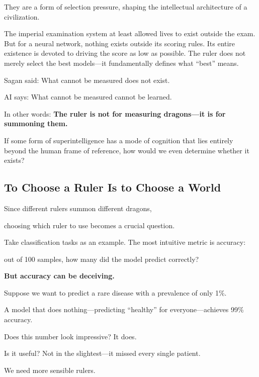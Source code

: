 They are a form of selection pressure, shaping the intellectual architecture of a civilization.

The imperial examination system at least allowed lives to exist outside the exam. But for a neural network, nothing exists outside its scoring rules. Its entire existence is devoted to driving the score as low as possible. The ruler does not merely select the best models---it fundamentally defines what ``best'' means.

\vspace{1em}

Sagan said: What cannot be measured does not exist.

AI says: What cannot be measured cannot be learned.

In other words: \textbf{The ruler is not for measuring dragons---it is for summoning them.}

\begin{thinkbox}
If some form of superintelligence has a mode of cognition that lies entirely beyond the human frame of reference, how would we even determine whether it exists?
\end{thinkbox}

\subsection{To Choose a Ruler Is to Choose a World}

Since different rulers summon different dragons,

choosing which ruler to use becomes a crucial question.

\vspace{1em}

Take classification tasks as an example. The most intuitive metric is accuracy:

out of 100 samples, how many did the model predict correctly?

\textbf{But accuracy can be deceiving.}

Suppose we want to predict a rare disease with a prevalence of only 1\%.

A model that does nothing---predicting ``healthy'' for everyone---achieves 99\% accuracy.

Does this number look impressive? It does.

Is it useful? Not in the slightest---it missed every single patient.

\vspace{1em}

We need more sensible rulers.

